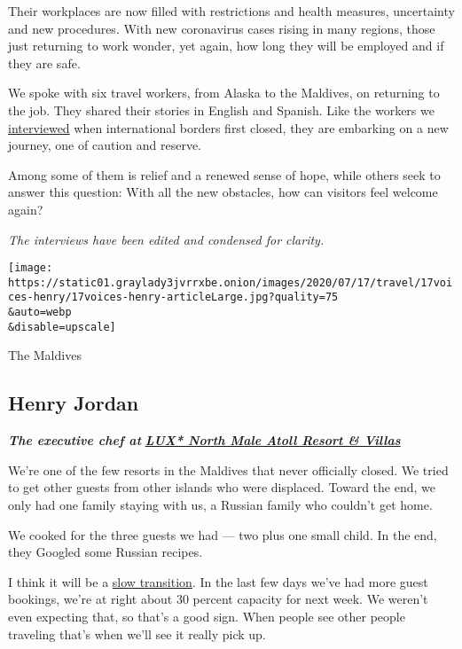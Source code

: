 Their workplaces are now filled with restrictions and health measures,
uncertainty and new procedures. With new coronavirus cases rising in
many regions, those just returning to work wonder, yet again, how long
they will be employed and if they are safe.

We spoke with six travel workers, from Alaska to the Maldives, on
returning to the job. They shared their stories in English and Spanish.
Like the workers we
\href{https://www.nytimes3xbfgragh.onion/2020/03/25/travel/coronavirus-travel-hospitality-workers.html}{interviewed}
when international borders first closed, they are embarking on a new
journey, one of caution and reserve.

Among some of them is relief and a renewed sense of hope, while others
seek to answer this question: With all the new obstacles, how can
visitors feel welcome again?

\emph{The interviews have been edited and condensed for clarity.}

\texttt{[image: https://static01.graylady3jvrrxbe.onion/images/2020/07/17/travel/17voices-henry/17voices-henry-articleLarge.jpg?quality=75\\\&auto=webp\\\&disable=upscale]}

The Maldives

\hypertarget{henry-jordan}{%
\subsection{Henry Jordan}\label{henry-jordan}}

\emph{\textbf{The executive chef at}}
\textbf{\href{https://www.luxresorts.com/en/maldives/hotel/luxnorthmaleatoll}{\emph{LUX*
North Male Atoll Resort \& Villas}}}

We're one of the few resorts in the Maldives that never officially
closed. We tried to get other guests from other islands who were
displaced. Toward the end, we only had one family staying with us, a
Russian family who couldn't get home.

We cooked for the three guests we had --- two plus one small child. In
the end, they Googled some Russian recipes.

I think it will be a
\href{http://www.tourism.gov.mv/en/news/maldives_welcomes_back_first_tourists}{slow
transition}. In the last few days we've had more guest bookings, we're
at right about 30 percent capacity for next week. We weren't even
expecting that, so that's a good sign. When people see other people
traveling that's when we'll see it really pick up.

